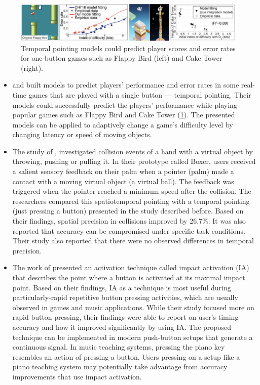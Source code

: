 \documentclass[manuscript,screen]{acmart}
\begin{document}
\begin{figure}[t]
\centering
 \includegraphics[width=12cm]{figures/flappybird.png}
    \caption{Temporal pointing models could predict player scores and error rates for one-button games such as Flappy Bird (left) and Cake Tower (right).
    }\label{fig:flappybird}
\end{figure}

\begin{itemize}
\item \citet{lee2016modelling} and \citet{lee2018moving} built models to predict players' performance and error rates in some real-time games that are played with a single button — temporal pointing. Their models could successfully predict the players' performance while playing popular games such as Flappy Bird and Cake Tower (\ref{fig:flappybird}). The presented models can be applied to adaptively change a game's difficulty level by changing latency or speed of moving objects. 
\item The study of \citet{lee2017boxer}, investigated collision events of a hand with a virtual object by throwing, pushing or pulling it. In their prototype called Boxer, users received a salient sensory feedback on their palm when a pointer (palm) made a contact with a moving virtual object (a virtual ball). The feedback was triggered when the pointer reached a minimum speed after the collision. The researchers compared this spatiotemporal pointing with a temporal pointing (just pressing a button) presented in the study described before. Based on their findings, spatial precision in collisions improved by 26.7\%. It was also reported that accuracy can be compromised under specific task conditions. Their study also reported that there were no observed differences in temporal precision.
\item The work of \citet{kim2018impact} presented an activation technique called impact activation (IA) that describes the point where a button is activated at its maximal impact point. Based on their findings, IA as a technique is most useful during particularly-rapid repetitive button pressing activities, which are usually observed in games and music applications. While their study focused more on rapid button pressing, their findings were able to report on user's timing accuracy and how it improved significantly by using IA. The proposed technique can be implemented in modern push-button setups that generate a continuous signal. In music teaching systems, pressing the piano key resembles an action of pressing a button. Users pressing on a setup like a piano teaching system may potentially take advantage from accuracy improvements that use impact activation.

\end{itemize}
\end{document}
